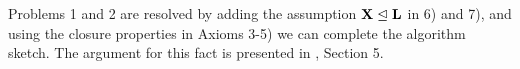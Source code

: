 %

Problems 1 and 2 are resolved by adding the assumption \(\mathbf{X} \trianglelefteq \mathbf{L}\) in 6) and 7), and using the closure properties in Axioms 3-5) we can complete the algorithm sketch. The argument for this fact is presented in \cite{GuttenbergRE23}, Section 5.

%
%

